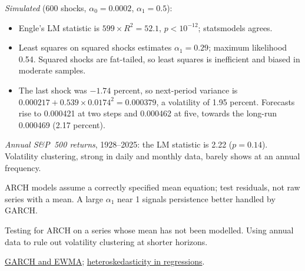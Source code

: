 \begin{qfmodel}
 \emph{Simulated} (600 shocks, $\alpha_0=0.0002$, $\alpha_1=0.5$):
\begin{itemize}
\item Engle's LM statistic is $599\times R^2=52.1$, $p<10^{-12}$; statsmodels agrees.
\item Least squares on squared shocks estimates $\alpha_1=0.29$; maximum likelihood 0.54. Squared shocks are fat-tailed, so least squares is inefficient and biased in moderate samples.
\item The last shock was $-1.74$ percent, so next-period variance is $0.000217+0.539\times0.0174^2=0.000379$, a volatility of 1.95 percent. Forecasts rise to 0.000421 at two steps and 0.000462 at five, towards the long-run 0.000469 (2.17 percent).
\end{itemize}
\emph{Annual S\&P~500 returns}, 1928--2025: the LM statistic is 2.22 ($p=0.14$). Volatility clustering, strong in daily and monthly data, barely shows at an annual frequency.

 ARCH models assume a correctly specified mean equation; test residuals, not raw series with a mean. A large $\alpha_1$ near 1 signals persistence better handled by GARCH.

 Testing for ARCH on a series whose mean has not been modelled. Using annual data to rule out volatility clustering at shorter horizons.

 \hyperref[mod:garch-volatility-forecast]{GARCH and EWMA}; \hyperref[meth:regression-misspecification]{heteroskedasticity in regressions}.

\end{qfmodel}

